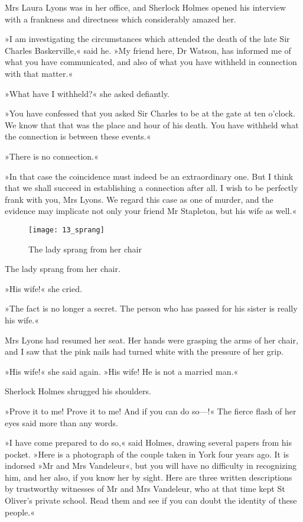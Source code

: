 Mrs Laura Lyons was in her office, and Sherlock Holmes opened his interview with a frankness and directness which considerably amazed her.

»I am investigating the circumstances which attended the death of the late Sir Charles Baskerville,« said he. »My friend here, Dr Watson, has informed me of what you have communicated, and also of what you have withheld in connection with that matter.«

»What have I withheld?« she asked defiantly.

»You have confessed that you asked Sir Charles to be at the gate at ten o'clock. We know that that was the place and hour of his death. You have withheld what the connection is between these events.«

»There is no connection.«

»In that case the coincidence must indeed be an extraordinary one. But I think that we shall succeed in establishing a connection after all. I wish to be perfectly frank with you, Mrs Lyons. We regard this case as one of murder, and the evidence may implicate not only your friend Mr Stapleton, but his wife as well.«

\begin{figure}[tbh]
\centering
\texttt{[image: 13\_sprang]}
\caption{The lady sprang from her chair}
\end{figure}

The lady sprang from her chair.

»His wife!« she cried.

»The fact is no longer a secret. The person who has passed for his sister is really his wife.«

Mrs Lyons had resumed her seat. Her hands were grasping the arms of her chair, and I saw that the pink nails had turned white with the pressure of her grip.

»His wife!« she said again. »His wife! He is not a married man.«

Sherlock Holmes shrugged his shoulders.

»Prove it to me! Prove it to me! And if you can do so\allowbreak---\allowbreak  !« The fierce flash of her eyes said more than any words.

»I have come prepared to do so,« said Holmes, drawing several papers from his pocket. »Here is a photograph of the couple taken in York four years ago. It is indorsed »Mr and Mrs Vandeleur«, but you will have no difficulty in recognizing him, and her also, if you know her by sight. Here are three written descriptions by trustworthy witnesses of Mr and Mrs Vandeleur, who at that time kept St Oliver's private school. Read them and see if you can doubt the identity of these people.«

